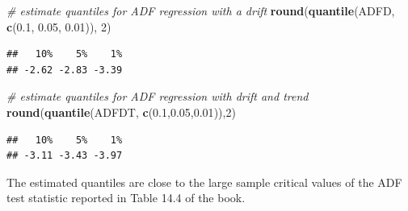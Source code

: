 \documentclass[]{book}
\newenvironment{Shaded}{\begin{snugshade}}{\end{snugshade}}
\newcommand{\KeywordTok}[1]{\textcolor[rgb]{0.13,0.29,0.53}{\textbf{#1}}}
\newcommand{\DataTypeTok}[1]{\textcolor[rgb]{0.13,0.29,0.53}{#1}}
\newcommand{\DecValTok}[1]{\textcolor[rgb]{0.00,0.00,0.81}{#1}}
\newcommand{\FloatTok}[1]{\textcolor[rgb]{0.00,0.00,0.81}{#1}}
\newcommand{\StringTok}[1]{\textcolor[rgb]{0.31,0.60,0.02}{#1}}
\newcommand{\CommentTok}[1]{\textcolor[rgb]{0.56,0.35,0.01}{\textit{#1}}}
\newcommand{\ControlFlowTok}[1]{\textcolor[rgb]{0.13,0.29,0.53}{\textbf{#1}}}
\newcommand{\OperatorTok}[1]{\textcolor[rgb]{0.81,0.36,0.00}{\textbf{#1}}}
\newcommand{\NormalTok}[1]{#1}
\theoremstyle{definition}
\theoremstyle{definition}
\theoremstyle{definition}
\theoremstyle{remark}
\begin{document}
\begin{Shaded}
\end{Shaded}

\begin{Shaded}
\begin{Highlighting}[]
\CommentTok{# estimate quantiles for ADF regression with a drift}
\KeywordTok{round}\NormalTok{(}\KeywordTok{quantile}\NormalTok{(ADFD, }\KeywordTok{c}\NormalTok{(}\FloatTok{0.1}\NormalTok{, }\FloatTok{0.05}\NormalTok{, }\FloatTok{0.01}\NormalTok{)), }\DecValTok{2}\NormalTok{)}
\end{Highlighting}
\end{Shaded}

\begin{verbatim}
##   10%    5%    1% 
## -2.62 -2.83 -3.39
\end{verbatim}

\begin{Shaded}
\begin{Highlighting}[]
\CommentTok{# estimate quantiles for ADF regression with drift and trend}
\KeywordTok{round}\NormalTok{(}\KeywordTok{quantile}\NormalTok{(ADFDT, }\KeywordTok{c}\NormalTok{(}\FloatTok{0.1}\NormalTok{,}\FloatTok{0.05}\NormalTok{,}\FloatTok{0.01}\NormalTok{)),}\DecValTok{2}\NormalTok{)}
\end{Highlighting}
\end{Shaded}

\begin{verbatim}
##   10%    5%    1% 
## -3.11 -3.43 -3.97
\end{verbatim}

The estimated quantiles are close to the large sample critical values of
the ADF test statistic reported in Table 14.4 of the book.
\end{document}
